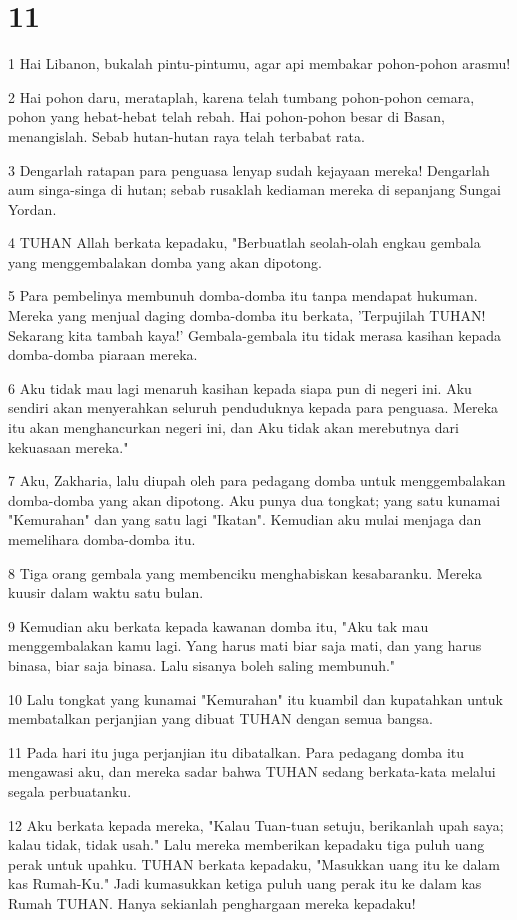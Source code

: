 \chapter{11}

\par 1 Hai Libanon, bukalah pintu-pintumu, agar api membakar pohon-pohon arasmu!
\par 2 Hai pohon daru, merataplah, karena telah tumbang pohon-pohon cemara, pohon yang hebat-hebat telah rebah. Hai pohon-pohon besar di Basan, menangislah. Sebab hutan-hutan raya telah terbabat rata.
\par 3 Dengarlah ratapan para penguasa lenyap sudah kejayaan mereka! Dengarlah aum singa-singa di hutan; sebab rusaklah kediaman mereka di sepanjang Sungai Yordan.
\par 4 TUHAN Allah berkata kepadaku, "Berbuatlah seolah-olah engkau gembala yang menggembalakan domba yang akan dipotong.
\par 5 Para pembelinya membunuh domba-domba itu tanpa mendapat hukuman. Mereka yang menjual daging domba-domba itu berkata, 'Terpujilah TUHAN! Sekarang kita tambah kaya!' Gembala-gembala itu tidak merasa kasihan kepada domba-domba piaraan mereka.
\par 6 Aku tidak mau lagi menaruh kasihan kepada siapa pun di negeri ini. Aku sendiri akan menyerahkan seluruh penduduknya kepada para penguasa. Mereka itu akan menghancurkan negeri ini, dan Aku tidak akan merebutnya dari kekuasaan mereka."
\par 7 Aku, Zakharia, lalu diupah oleh para pedagang domba untuk menggembalakan domba-domba yang akan dipotong. Aku punya dua tongkat; yang satu kunamai "Kemurahan" dan yang satu lagi "Ikatan". Kemudian aku mulai menjaga dan memelihara domba-domba itu.
\par 8 Tiga orang gembala yang membenciku menghabiskan kesabaranku. Mereka kuusir dalam waktu satu bulan.
\par 9 Kemudian aku berkata kepada kawanan domba itu, "Aku tak mau menggembalakan kamu lagi. Yang harus mati biar saja mati, dan yang harus binasa, biar saja binasa. Lalu sisanya boleh saling membunuh."
\par 10 Lalu tongkat yang kunamai "Kemurahan" itu kuambil dan kupatahkan untuk membatalkan perjanjian yang dibuat TUHAN dengan semua bangsa.
\par 11 Pada hari itu juga perjanjian itu dibatalkan. Para pedagang domba itu mengawasi aku, dan mereka sadar bahwa TUHAN sedang berkata-kata melalui segala perbuatanku.
\par 12 Aku berkata kepada mereka, "Kalau Tuan-tuan setuju, berikanlah upah saya; kalau tidak, tidak usah." Lalu mereka memberikan kepadaku tiga puluh uang perak untuk upahku. TUHAN berkata kepadaku, "Masukkan uang itu ke dalam kas Rumah-Ku." Jadi kumasukkan ketiga puluh uang perak itu ke dalam kas Rumah TUHAN. Hanya sekianlah penghargaan mereka kepadaku!
